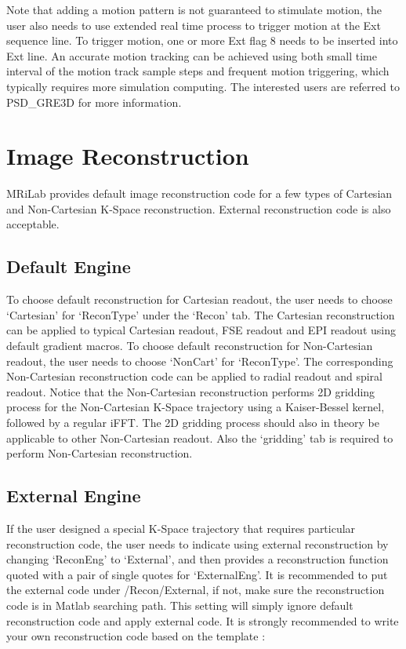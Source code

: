 \documentclass{book}%
\begin{document}
Note that adding a motion pattern is not guaranteed to stimulate motion, the user also needs to use extended real time process to trigger motion at the Ext sequence line. To trigger motion, one or more Ext flag 8 needs to be inserted into Ext line. An accurate motion tracking can be achieved using both small time interval of the motion track sample steps and frequent motion triggering, which typically requires more simulation computing. The interested users are referred to PSD\_GRE3D for more information.

\section{Image Reconstruction}

MRiLab provides default image reconstruction code for a few types of Cartesian and Non-Cartesian K-Space reconstruction. External reconstruction code is also acceptable.

\subsection{Default Engine}

To choose default reconstruction for Cartesian readout, the user needs to choose `Cartesian' for `ReconType' under the `Recon' tab. The Cartesian reconstruction can be applied to typical Cartesian readout, FSE readout and EPI readout using default gradient macros. To choose default reconstruction for Non-Cartesian readout, the user needs to choose `NonCart' for `ReconType'. The corresponding Non-Cartesian reconstruction code can be applied to radial readout and spiral readout. Notice that the Non-Cartesian reconstruction performs 2D gridding process for the Non-Cartesian K-Space trajectory using a Kaiser-Bessel kernel, followed by a regular iFFT. The 2D gridding process should also in theory be applicable to other Non-Cartesian readout. Also the `gridding' tab is required to perform Non-Cartesian reconstruction.


\subsection{External Engine}

If the user designed a special K-Space trajectory that requires particular reconstruction code, the user needs to indicate using external reconstruction by changing `ReconEng' to `External', and then provides a reconstruction function quoted with a pair of single quotes for `ExternalEng'. It is recommended to put the external code under /Recon/External, if not, make sure the reconstruction code is in Matlab searching path. This setting will simply ignore default reconstruction code and apply external code. It is strongly recommended to write your own reconstruction code based on the template :
\end{document}
